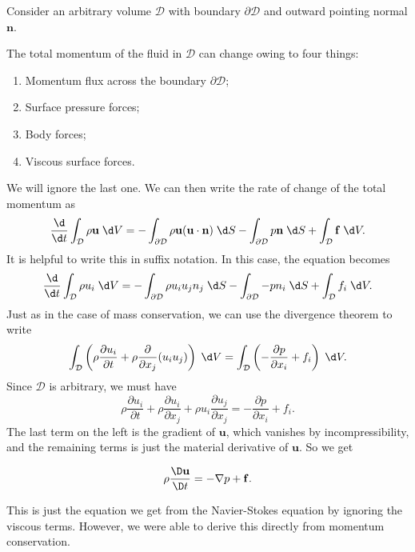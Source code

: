 \documentclass[a4paper]{article}
\begin{document}
Consider an arbitrary volume $\mathcal{D}$ with boundary $\partial \mathcal{D}$ and outward pointing normal $\mathbf{n}$.
\begin{center}
\end{center}
The total momentum of the fluid in $\mathcal{D}$ can change owing to four things:
\begin{enumerate}
  \item Momentum flux across the boundary $\partial \mathcal{D}$;
  \item Surface pressure forces;
  \item Body forces;
  \item Viscous surface forces.
\end{enumerate}
We will ignore the last one. We can then write the rate of change of the total momentum as
\[
  \frac{\d}{\d t} \int_{\mathcal{D}} \rho \mathbf{u} \;\d V = -\int_{\partial \mathcal{D}} \rho \mathbf{u} (\mathbf{u}\cdot \mathbf{n}) \;\d S - \int_{\partial \mathcal{D}} p \mathbf{n}\;\d S + \int_{\mathcal{D}} \mathbf{f}\;\d V.
\]
It is helpful to write this in suffix notation. In this case, the equation becomes
\[
  \frac{\d}{\d t} \int_{\mathcal{D}} \rho u_i \;\d V = -\int_{\partial \mathcal{D}} \rho u_i u_j n_j \;\d S - \int_{\partial \mathcal{D}} - p n_i \;\d S + \int_{\mathcal{D}} f_i \;\d V.
\]
Just as in the case of mass conservation, we can use the divergence theorem to write
\[
  \int_{\mathcal{D}} \left(\rho \frac{\partial u_i}{\partial t} + \rho \frac{\partial}{\partial x_j} (u_i u_j)\right)\;\d V = \int_{\mathcal{D}} \left(-\frac{\partial p}{\partial x_i} + f_i\right) \;\d V.
\]
Since $\mathcal{D}$ is arbitrary, we must have
\[
  \rho \frac{\partial u_i}{\partial t} + \rho \frac{\partial u_i}{\partial x_j} + \rho u_i \frac{\partial u_j}{\partial x_j} = -\frac{\partial p}{\partial x_i} + f_i.
\]
The last term on the left is the gradient of $\mathbf{u}$, which vanishes by incompressibility, and the remaining terms is just the material derivative of $\mathbf{u}$. So we get
\begin{prop}
  \[
    \rho \frac{\D \mathbf{u}}{\D t} = - \nabla p + \mathbf{f}.
  \]
\end{prop}
This is just the equation we get from the Navier-Stokes equation by ignoring the viscous terms. However, we were able to derive this directly from momentum conservation.
\end{document}
